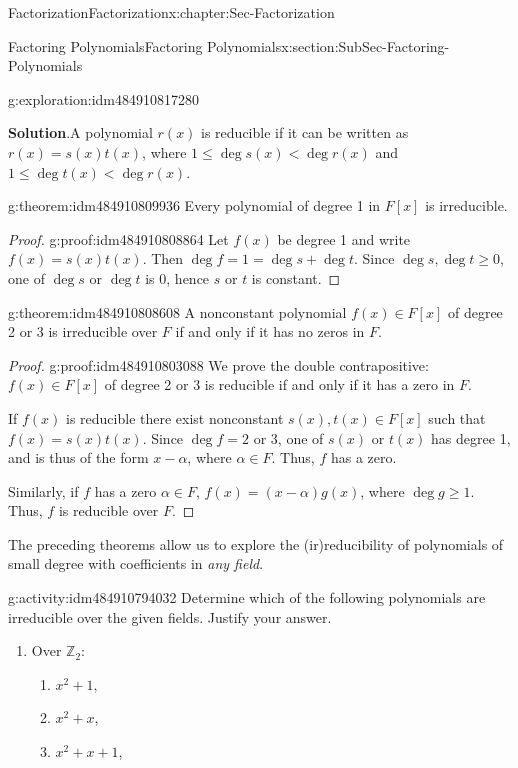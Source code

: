 \documentclass[oneside,10pt,]{book}
\newcommand{\blocktitlefont}{\relax}
\numberwithin{equation}{section}
\renewcommand{\le}{\leqslant}
\renewcommand{\ge}{\geqslant}
\def\Z{{\mathbb Z}}
\newcommand{\lt}{<}
\begin{document}
\begin{chapterptx}{Factorization}{}{Factorization}{}{}{x:chapter:Sec-Factorization}
\begin{sectionptx}{Factoring Polynomials}{}{Factoring Polynomials}{}{}{x:section:SubSec-Factoring-Polynomials}
\begin{exploration}{}{g:exploration:idm484910817280}
\par\smallskip%
\noindent\textbf{\blocktitlefont Solution}.\hypertarget{g:solution:idm484910811984}{}\quad{}A polynomial \(r(x)\) is reducible if it can be written as \(r(x) = s(x) t(x)\), where \(1 \le \deg s(x) \lt \deg r(x)\) and \(1 \le \deg t(x) \lt \deg r(x)\).%
\end{exploration}
\begin{theorem}{}{}{g:theorem:idm484910809936}%
Every polynomial of degree 1 in \(F[x]\) is irreducible.%
\end{theorem}
\begin{proof}{}{g:proof:idm484910808864}
Let \(f(x)\) be degree 1 and write \(f(x) = s(x) t(x)\). Then \(\deg f = 1 = \deg s + \deg t\). Since \(\deg s, \deg t \ge 0\), one of \(\deg s\) or \(\deg t\) is 0, hence \(s\) or \(t\) is constant.%
\end{proof}
\begin{theorem}{}{}{g:theorem:idm484910808608}%
A nonconstant polynomial \(f(x)\in F[x]\) of degree 2 or 3 is irreducible over \(F\) if and only if it has no zeros in \(F\).%
\end{theorem}
\begin{proof}{}{g:proof:idm484910803088}
We prove the double contrapositive: \(f(x)\in F[x]\) of degree 2 or 3 is reducible if and only if it has a zero in \(F\).%
\par
If \(f(x)\) is reducible there exist nonconstant \(s(x),t(x)\in F[x]\) such that \(f(x) = s(x) t(x)\). Since \(\deg f = 2\) or 3, one of \(s(x)\) or \(t(x)\) has degree 1, and is thus of the form \(x-\alpha\), where \(\alpha \in F\). Thus, \(f\) has a zero.%
\par
Similarly, if \(f\) has a zero \(\alpha\in F\), \(f(x) = (x-\alpha)g(x)\), where \(\deg g \ge 1\). Thus, \(f\) is reducible over \(F\).%
\end{proof}
The preceding theorems allow us to explore the (ir)reducibility of polynomials of small degree with coefficients in \emph{any field}.%
\begin{activity}{}{g:activity:idm484910794032}%
Determine which of the following polynomials are irreducible over the given fields. Justify your answer.%
%
\begin{enumerate}
\item{}Over \(\Z_2\):%
%
\begin{enumerate}
\item{}\(x^2 + 1\),%
\item{}\(x^2 + x\),%
\item{}\(x^2 +x +1\),%

\end{enumerate}
\end{enumerate}
\end{activity}
\end{sectionptx}
\end{chapterptx}
\end{document}
